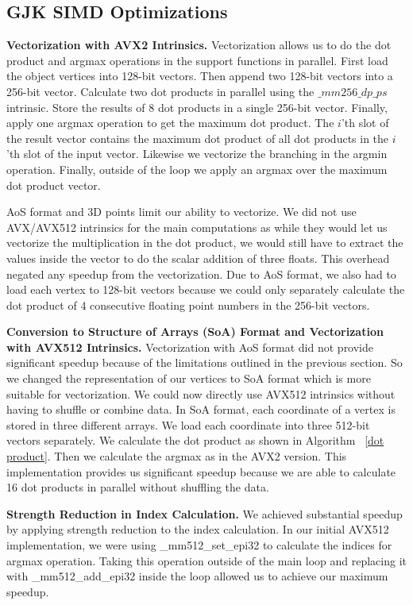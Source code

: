 \documentclass[twocolumn]{article}
\newcommand{\mypar}[1]{{\bf #1.}}
\begin{document}
\subsection{GJK SIMD Optimizations}
\mypar{Vectorization with AVX2 Intrinsics}
Vectorization allows us to do the dot product and argmax operations in the support functions in parallel. First load the object vertices into 
128-bit vectors. Then append two 128-bit vectors into a 256-bit vector. Calculate two dot products in parallel using the $\_mm256\_dp\_ps$ intrinsic. Store the results of 8 dot products in a single 256-bit vector. Finally, apply one argmax operation to get the maximum dot product. The $i$'th slot of the result vector contains the maximum dot product of all dot products in the $i$'th slot of the input vector. Likewise we vectorize the branching in the argmin operation. Finally, outside of the loop we apply an argmax over the maximum dot product vector.

AoS format and 3D points limit our ability to vectorize. We did not use AVX/AVX512 intrinsics for the main computations as while they would let us vectorize the multiplication in the dot product, we would still have to extract the values inside the vector to do the scalar addition of three floats. This overhead negated any speedup from the vectorization. Due to AoS format, we also had to load each vertex to 128-bit vectors because we could only separately calculate the dot product of 4 consecutive floating point numbers in the 256-bit vectors. 

\mypar{Conversion to Structure of Arrays (SoA) Format and Vectorization with AVX512 Intrinsics}
Vectorization with AoS format did not provide significant speedup because of the limitations outlined in the previous section. So we changed the representation of our vertices to SoA format which is more suitable for vectorization. We could now directly use AVX512 intrinsics without having to shuffle or combine data. In SoA format, each coordinate of a vertex is stored in three different arrays. We load each coordinate into three 512-bit vectors separately. We calculate the dot product as shown in Algorithm ~\ref{dot product}. Then we calculate the argmax as in the AVX2 version. This implementation provides us significant speedup because we are able to calculate 16 dot products in parallel without shuffling the data.

\mypar{Strength Reduction in Index Calculation}
We achieved substantial speedup by applying strength reduction to the index calculation. In our initial AVX512 implementation, we were using \_mm512\_set\_epi32 to calculate the indices for argmax operation. Taking this operation outside of the main loop and replacing it with \_mm512\_add\_epi32 inside the loop allowed us to achieve our maximum speedup.
\end{document}

